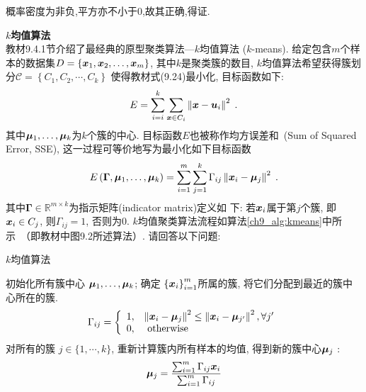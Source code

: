 \documentclass[answers]{exam}  %
\begin{document}
\begin{questions}
\begin{solution}
\begin{enumerate}
			      概率密度为非负,平方亦不小于0,故其正确,得证.
		\end{enumerate}
	\end{solution}

	\question [20] \textbf{$k$均值算法} \\
	\label{ch9_prob:kmeans}
	教材9.4.1节介绍了最经典的原型聚类算法---$k$均值算法 ($k$-means). 给定包含$m$个样本的数据集$D =\left\{{\boldsymbol{x}}_{1}, {\boldsymbol{x}}_{2}, \ldots, {\boldsymbol{x}}_{m}\right\}$, 其中$k$是聚类簇的数目, $k$均值算法希望获得簇划分$\mathcal{C}=\left\{C_{1}, C_{2}, \cdots, C_{k}\right\}$
	使得教材式(9.24)最小化, 目标函数如下:
	\begin{equation}
		E=\sum_{i=i}^{k}\sum_{{\boldsymbol{x}} \in C_{i}}\left\| {\boldsymbol{x}}-\boldsymbol{u}_{i} \right\|^{2}\;.
	\end{equation}
	其中$\boldsymbol{\mu}_{1}, \ldots, \boldsymbol{\mu}_{k}$为$k$个簇的中心. 目标函数$E$也被称作均方误差和~(Sum of Squared Error, SSE),
	这一过程可等价地写为最小化如下目标函数
	\begin{equation} \label{ch9_kmeans_obj}
		E\left(\mathbf{\Gamma}, \boldsymbol{\mu}_{1}, \ldots, \boldsymbol{\mu}_{k}\right)=\sum_{i=1}^{m} \sum_{j=1}^{k} {\Gamma}_{i j}\left\|{\boldsymbol{x}}_{i}-\boldsymbol{\mu}_{j}\right\|^{2}\;.
	\end{equation}
	其中$\mathbf{\Gamma} \in \mathbb{R}^{m \times k}$为指示矩阵(indicator matrix)定义如
	下: 若${\boldsymbol{x}}_{i}$属于第$j$个簇, 即${\boldsymbol{x}}_i\in C_j$, 则${\Gamma}_{i j}=1$, 否则为0.
	$k$均值聚类算法流程如算法\ref{ch9_alg:kmeans}中所示~（即教材中图9.2所述算法）. 请回答以下问题:
	{\begin{algorithm}[ht]
		\caption{ $k$均值算法 }
		\label{ch9_alg:kmeans}
		\begin{algorithmic}[1]{
				\State 初始化所有簇中心 $\boldsymbol{\mu}_{1}, \ldots, \boldsymbol{\mu}_{k}$;
				\Repeat
				 确定 $\left\{{\boldsymbol{x}}_{i}\right\}_{i=1}^{m}$所属的簇, 将它们分配到最近的簇中心所在的簇.
				\begin{align}{\Gamma}_{i j}=\left\{\begin{array}{ll}
						1, & \left\|{\boldsymbol{x}}_{i}-\boldsymbol{\mu}_{j}\right\|^{2} \leq \left\|{\boldsymbol{x}}_{i}-\boldsymbol{\mu}_{j^{\prime}}\right\|^{2}, \forall j^{\prime} \\
						0, & \text { otherwise }
					\end{array}\right.\end{align} \label{ch9_:step1}
				 对所有的簇 $j \in\{1, \cdots, k\}$, 重新计算簇内所有样本的均值, 得到新的簇中心$\boldsymbol{\mu}_j$  :
				\begin{align}\boldsymbol{\mu}_{j}=\frac{\sum_{i=1}^{m} {\Gamma}_{i j} {\boldsymbol{x}}_{i}}{\sum_{i=1}^{m} {\Gamma}_{i j}}\end{align}

}
\end{algorithmic}
\end{algorithm}}
\end{questions}
\end{document}
